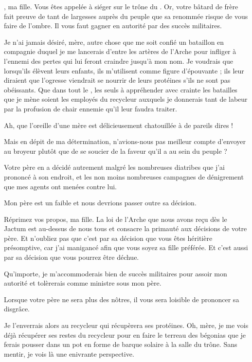 \begin{drama}
  \reinespeaks \princesse, ma fille. Vous êtes appelée à siéger sur le trône du \campprincipal{}. Or, votre bâtard de frère fait preuve de tant de largesses auprès du peuple que sa renommée risque de vous faire de l’ombre. Il vous faut gagner en autorité par des succès militaires.

  \princessespeaks Je n’ai jamais désiré, mère, autre chose que me soit confié un bataillon en compagnie duquel je me lancerais d’entre les artères de l’Arche pour infliger à l’ennemi des pertes qui lui feront craindre jusqu’à mon nom. Je voudrais que lorsqu’ils élèvent leurs enfants, ils m’utilisent comme figure d’épouvante ; ils leur diraient que \princesse{}  l’ogresse viendrait se nourrir de leurs protéines s’ils ne sont pas obéissants. Que dans tout le \campprincipal{}, les seuls à appréhender avec crainte les batailles que je mène soient les employés du recycleur auxquels je donnerais tant de labeur par la profusion de chair ennemie qu’il leur faudra traiter.

  \reinespeaks Ah, que l’oreille d’une mère est délicieusement chatouillée à de pareils dires !

  \princessespeaks Mais en dépit de ma détermination, n’avions-nous pas meilleur compte d’envoyer \elena{} au broyeur plutôt que de se soucier de la faveur qu’il a au sein du peuple ?

  \reinespeaks Votre père en a décidé autrement malgré les nombreuses diatribes que j’ai prononcé à son endroit, et les non moins nombreuses campagnes de dénigrement que mes agents ont menées contre lui.

  \princessespeaks Mon père est un faible et nous devrions passer outre sa décision.

  \reinespeaks Réprimez vos propos, ma fille. La loi de l’Arche que nous avons reçu dès le Jactum est au-dessus de nous tous et consacre la primauté aux décisions de votre père. Et n’oubliez pas que c’est par sa décision que vous êtes héritière présomptive, car j’ai manigancé afin que vous soyez sa fille préférée. Et c’est aussi par sa décision que vous pourrez être déchue.

  \princessespeaks Qu’importe, je m’accommoderais bien de succès militaires pour assoir mon autorité et tolèrerais \elena{} comme ministre sous mon père.

  \reinespeaks Lorsque votre père ne sera plus des nôtres, il vous sera loisible de prononcer sa disgrâce.

  \princessespeaks Je %
  l’enverrais alors au recycleur qui récupèrera ses protéines. Oh, mère, je me vois déjà récupérer ses restes du recycleur pour en faire le terreau des bégonias que je ferais pousser dans un pot en forme de barque solaire à la salle du trône. Sans mentir, je vois là une enivrante perspective.


\end{drama}
